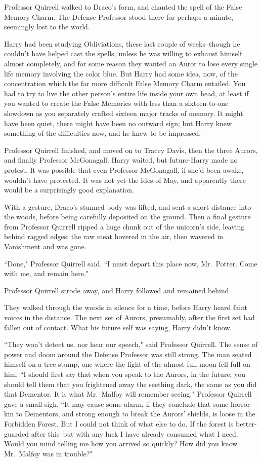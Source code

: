 Professor Quirrell walked to Draco's form, and chanted the spell of the False Memory Charm. The Defense Professor stood there for perhaps a minute, seemingly lost to the world.

Harry had been studying Obliviations, these last couple of weeks\---though he couldn't have helped cast the spells, unless he was willing to exhaust himself almost completely, and for some reason they wanted an Auror to lose every single life memory involving the color blue. But Harry had some idea, now, of the concentration which the far more difficult False Memory Charm entailed. You had to try to live the other person's entire life inside your own head, at least if you wanted to create the False Memories with less than a sixteen-to-one slowdown as you separately crafted sixteen major tracks of memory. It might have been quiet, there might have been no outward sign; but Harry knew something of the difficulties now, and he knew to be impressed.

Professor Quirrell finished, and moved on to Tracey Davis, then the three Aurors, and finally Professor McGonagall. Harry waited, but future-Harry made no protest. It was possible that even Professor McGonagall, if she'd been awake, wouldn't have protested. It was not yet the Ides of May, and apparently there would be a surprisingly good explanation.

With a gesture, Draco's stunned body was lifted, and sent a short distance into the woods, before being carefully deposited on the ground. Then a final gesture from Professor Quirrell ripped a huge chunk out of the unicorn's side, leaving behind ragged edges; the raw meat hovered in the air, then wavered in Vanishment and was gone.

``Done," Professor Quirrell said. ``I must depart this place now, Mr.~Potter. Come with me, and remain here."

Professor Quirrell strode away, and Harry followed and remained behind.

They walked through the woods in silence for a time, before Harry heard faint voices in the distance. The next set of Aurors, presumably, after the first set had fallen out of contact. What his future self was saying, Harry didn't know.

``They won't detect us, nor hear our speech," said Professor Quirrell. The sense of power and doom around the Defense Professor was still strong. The man seated himself on a tree stump, one where the light of the almost-full moon fell full on him. ``I should first say that when you speak to the Aurors, in the future, you should tell them that you frightened away the seething dark, the same as you did that Dementor. It is what Mr.~Malfoy will remember seeing." Professor Quirrell gave a small sigh. ``It may cause some alarm, if they conclude that some horror kin to Dementors, and strong enough to break the Aurors' shields, is loose in the Forbidden Forest. But I could not think of what else to do. If the forest is better-guarded after this\---but with any luck I have already consumed what I need. Would you mind telling me how you arrived so quickly? How did you know Mr.~Malfoy was in trouble?"

